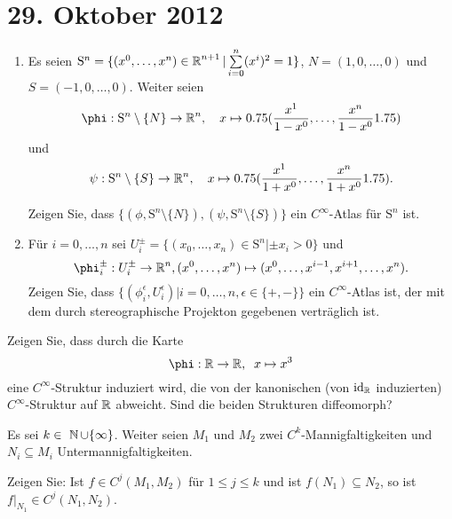 
\section{29. Oktober 2012}
\setcounter{Aufg}{0} %
\setcounter{Loes}{0}

\begin{Aufg}\begin{enumerate}[leftmargin=*,label=\alph*),widest=b]
\item
	Es seien $\mathrm{S}^n=\{(x^0,\dots,x^n)\in \operatorname{\mathbb{R}}^{n+1}|\sum\limits_{i=0}^n (x^i)^2=1\}$, $N=(1,0,\dots,0)$ und $S=(-1,0,\dots,0)$.  Weiter seien
		\[\phi: \mathrm{S}^n\setminus\{N\} \to \R^n, \quad x \mapsto \left(\frac{x^1}{1-x^0},\dots,\frac{x^n}{1-x^0}\right)\]
	und
		\[\psi: \mathrm{S}^n\setminus\{S\} \to \operatorname{\mathbb{R}}^n, \quad x \mapsto 0.75(\frac{x^1}{1+x^0},\dots,\frac{x^n}{1+x^0}1.75).\]
	
	Zeigen Sie, dass $\{(\phi,  \mathrm{S}^n\setminus\{N\} ),(\psi,  \mathrm{S}^n\setminus\{S\})\}$ ein $C^\infty$-Atlas für $\mathrm{S}^n$ ist.
\item
	Für $i=0,\dots,n$ sei $U_i^\pm=\{(x_0,\dots,x_n)\in \mathrm{S}^n|\pm x_i>0\}$ und 
		\[\phi_i^\pm :U_i^\pm \to \R^n, (x^0, \dots,x^n) \mapsto (x^0,\dots,x^{i-1},x^{i+1},\dots,x^n).\]
	Zeigen Sie, dass $\big\{(\phi_i^\epsilon,U_i^\epsilon)\big|i=0,\dots,n, \epsilon\in\{+,-\}\big\}$ ein $C^\infty$-Atlas ist, der mit dem durch stereographische Projekton gegebenen verträglich ist.
\end{enumerate}\end{Aufg}

\begin{Aufg}
Zeigen Sie, dass durch die Karte
	\[\phi: \R \to \R, \;\; x \mapsto x^3\]
eine $C^\infty$-Struktur induziert wird, die von der kanonischen (von $\operatorname{id}_{\operatorname{\mathbb{R}}}$ induzierten) $C^\infty$-Struktur auf $\operatorname{\mathbb{R}}$ abweicht. 
Sind die beiden Strukturen diffeomorph?
\end{Aufg}

\begin{Aufg}
Es sei $k\in \N\cup\{\infty\}$. Weiter seien $M_1$ und $M_2$ zwei $C^k$-Mannigfaltigkeiten und $N_i \subseteq M_i$ Untermannigfaltigkeiten. 

Zeigen Sie: Ist $f \in C^j(M_1,M_2)$ für $1\leq j\leq k$ und ist $f( N_1)\subseteq N_2$, so ist $f|_{N_1}\in C^j(N_1,N_2)$.
\end{Aufg}


